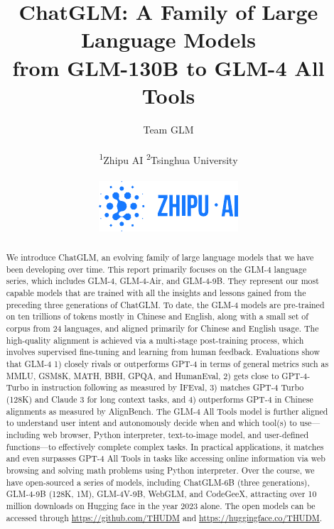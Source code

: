 \documentclass{article}
\title{ChatGLM: A Family of Large Language Models \\from GLM-130B to GLM-4 All Tools}
\author{
Team GLM\\ \\
\textsuperscript{1}Zhipu AI \quad
\textsuperscript{2}Tsinghua University \quad 
\\ \\
{\includegraphics[height=3.5ex]{figs/zhipu-logo}}
}
\begin{document}
\maketitle
\renewcommand{\thefootnote}{\fnsymbol{footnote}}
\renewcommand{\thefootnote}{\arabic{footnote}}

 


\begin{abstract}

We introduce ChatGLM, an evolving family of large language models that we have been developing over time. 
This report primarily focuses on the GLM-4 language series, which includes GLM-4, GLM-4-Air, and GLM-4-9B. 
They represent our most capable models that are trained with all the insights and lessons gained from the preceding three generations of ChatGLM. 
To date, the GLM-4 models are pre-trained on ten trillions of tokens mostly in Chinese and English, along with a small set of corpus from 24 languages, and aligned primarily for Chinese and English usage. 
The high-quality alignment is achieved via a multi-stage post-training process, which involves supervised fine-tuning and learning from human feedback. 
Evaluations show that GLM-4 1) closely rivals or outperforms GPT-4 in terms of general metrics such as MMLU, GSM8K, MATH, BBH, GPQA, and HumanEval, 2) gets close to GPT-4-Turbo in instruction following as measured by IFEval, 3) matches GPT-4 Turbo (128K) and Claude 3 for long context tasks, and 4) outperforms GPT-4 in Chinese alignments as measured by AlignBench. 
The GLM-4 All Tools model is further aligned to understand user intent and autonomously decide when and which tool(s) to use---including web browser, Python interpreter, text-to-image model, and user-defined functions---to effectively complete complex tasks. 
In practical applications, it matches and even surpasses GPT-4 All Tools in tasks like accessing online information via web browsing and solving math problems using Python interpreter. 
Over the course, we have open-sourced a series of models, including ChatGLM-6B (three generations), GLM-4-9B (128K, 1M), GLM-4V-9B, WebGLM, and CodeGeeX, attracting over 10 million downloads on Hugging face in the year 2023 alone. 
The open models can be accessed through \url{https://github.com/THUDM} and \url{https://huggingface.co/THUDM}. 

\end{abstract}
\clearpage
\end{document}
